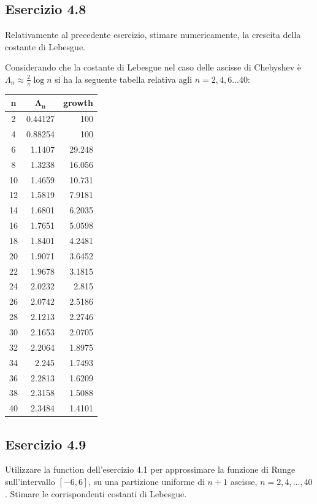 	\subsection {Esercizio 4.8}
Relativamente al precedente esercizio, stimare numericamente, la crescita della costante di Lebesgue.

Considerando che la costante di Lebesgue nel caso delle ascisse di Chebyshev è $\Lambda_n \approx \frac{2}{\pi}\log{n} $ si ha la seguente tabella relativa agli $n=2,4,6 ... 40$:
\begin{tabular}{ c | r | r }
\textbf{n} & \multicolumn{1}{c}{$\mathbf{\Lambda_n}$} & \multicolumn{1}{c}{\textbf{growth}}\\
\hline
      2   &  0.44127  &     100  \\
      4   &  0.88254  &     100  \\
      6   &   1.1407  &  29.248  \\
      8   &   1.3238  &  16.056  \\
     10   &   1.4659  &  10.731  \\
     12   &   1.5819  &  7.9181  \\
     14   &   1.6801  &  6.2035  \\
     16   &   1.7651  &  5.0598  \\
     18   &   1.8401  &  4.2481  \\
     20   &   1.9071  &  3.6452  \\
     22   &   1.9678  &  3.1815  \\
     24   &   2.0232  &   2.815  \\
     26   &   2.0742  &  2.5186  \\
     28   &   2.1213  &  2.2746  \\
     30   &   2.1653  &  2.0705  \\
     32   &   2.2064  &  1.8975  \\
     34   &    2.245  &  1.7493  \\
     36   &   2.2813  &  1.6209  \\
     38   &   2.3158  &  1.5088  \\
     40   &   2.3484  &  1.4101  \\
\end{tabular}



	\subsection {Esercizio 4.9}
Utilizzare la function dell'esercizio 4.1 per approssimare la funzione di Runge sull'intervallo $[-6,6]$, su una partizione uniforme di $n+1$ ascisse, $n= 2,4, ... ,40$. Stimare le corrispondenti costanti di Lebesgue.

